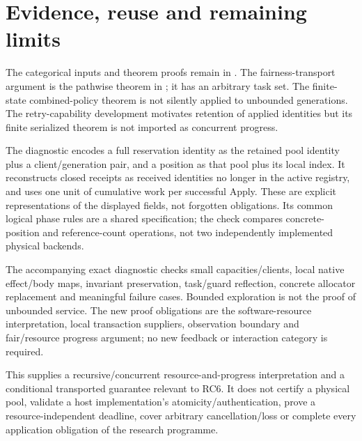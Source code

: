 \documentclass[11pt]{article}
\begin{document}
\section{Evidence, reuse and remaining limits}

The categorical inputs and theorem proofs remain in . The fairness-transport argument is the pathwise theorem in ; it has an arbitrary task set. The finite-state combined-policy theorem is not silently applied to unbounded generations. The retry-capability development motivates retention of applied identities but its finite serialized theorem is not imported as concurrent progress.

The diagnostic encodes a full reservation identity as the retained pool identity plus a client/generation pair, and a position as that pool plus its local index. It reconstructs closed receipts as received identities no longer in the active registry, and uses one unit of cumulative work per successful Apply. These are explicit representations of the displayed fields, not forgotten obligations. Its common logical phase rules are a shared specification; the check compares concrete-position and reference-count operations, not two independently implemented physical backends.

The accompanying exact diagnostic checks small capacities/clients, local native effect/body maps, invariant preservation, task/guard reflection, concrete allocator replacement and meaningful failure cases. Bounded exploration is not the proof of unbounded service. The new proof obligations are the software-resource interpretation, local transaction suppliers, observation boundary and fair/resource progress argument; no new feedback or interaction category is required.

This supplies a recursive/concurrent resource-and-progress interpretation and a conditional transported guarantee relevant to RC6. It does not certify a physical pool, validate a host implementation's atomicity/authentication, prove a resource-independent deadline, cover arbitrary cancellation/loss or complete every application obligation of the research programme.
\end{document}

